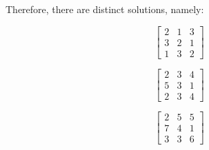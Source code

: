 \documentclass[11pt, letterpaper]{article}
\begin{document}
\begin{solution}{2}
Therefore, there are  distinct solutions, namely:

$$\begin{bmatrix}
2 & 1 & 3\\
3 & 2 & 1\\
1 & 3 & 2
\end{bmatrix}$$


$$\begin{bmatrix}
2 & 3 & 4\\
5 & 3 & 1\\
2 & 3 & 4
\end{bmatrix}$$


$$\begin{bmatrix}
2 & 5 & 5\\
7 & 4 & 1\\
3 & 3 & 6
\end{bmatrix}$$

\end{solution}
\end{document}
